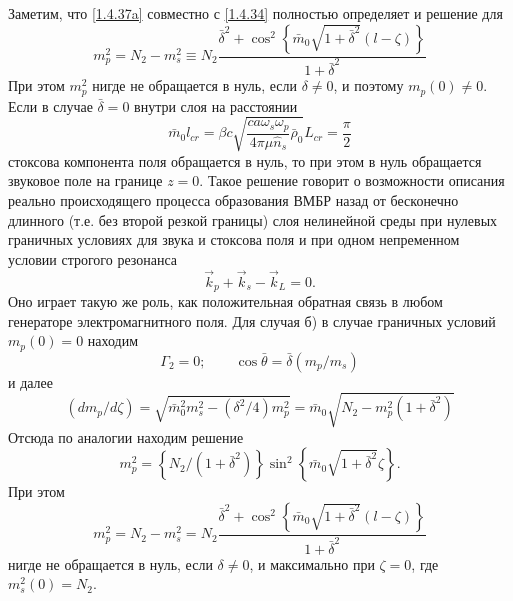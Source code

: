 \documentclass[a4paper]{article}
\begin{document}
Заметим, что \eqref{1.4.37a} совместно с \eqref{1.4.34} полностью определяет и решение для 
\begin{equation}
	m_{p}^{2}=N_{2}-m_{s}^{2}\equiv N_{2}\frac{\bar{\delta}^{2}+\cos^{2}\left\{\bar{m}_{0}\sqrt{1+\bar{\delta}^{2}}(l-\zeta)\right\}}{1+\bar{\delta}^{2}}
	\label{1.4.38a}\tag{38a}
\end{equation}
При этом $m_{p}^{2}$ нигде не обращается в нуль, если $\delta\neq0$, и поэтому $m_{p}(0)\neq0$.
\setcounter{equation}{38}
Если в случае $\bar{\delta}=0$  внутри слоя на расстоянии 
\begin{equation}
	\bar{m}_{0}l_{cr}=\beta c\sqrt{\frac{ca\omega_{s}\omega_{p}}{4\pi\mu\hat{n}_{s}}\bar{\rho}_{0}}L_{cr}=\frac{\pi}{2}
	\label{1.4.39}
\end{equation}
стоксова компонента поля обращается в нуль, то при этом в нуль обращается звуковое поле на границе $z=0$. Такое решение говорит о возможности описания реально происходящего процесса образования ВМБР назад от бесконечно длинного (т.е. без второй резкой границы) слоя нелинейной среды при нулевых граничных условиях для звука и стоксова поля и при одном непременном условии строгого резонанса
\begin{equation}
	\vec{k}_{p}+\vec{k}_{s}-\vec{k}_{L}=0.
	\label{1.4.40}
\end{equation}
Оно играет такую же роль, как положительная обратная связь в любом генераторе электромагнитного поля. 
Для случая б) в случае  граничных условий $m_{p}(0)=0$  находим 
\begin{equation}
	\Gamma_{2}=0;\qquad\cos\bar{\theta}=\bar{\delta}(m_{p}/m_{s})
	\tag{35б}\label{1.4.35б}
\end{equation}
и далее
\begin{equation}
	(dm_{p}/d\zeta)=\sqrt{\bar{m}_{0}^{2}m_{s}^{2}-(\delta^{2}/4)m_{p}^{2}}=\bar{m}_{0}\sqrt{N_{2}-m_{p}^{2}(1+\bar{\delta}^{2})}
	\tag{36б}\label{1.4.36б}
\end{equation}
Отсюда по аналогии находим решение 
\begin{equation}
	m_{p}^{2}=\left\{N_{2}/(1+\bar{\delta}^{2})\right\}\sin^{2}\left\{\bar{m}_{0}\sqrt{1+\bar{\delta}^{2}}\zeta\right\}.
	\tag{37б}\label{1.4.37б}
\end{equation}
При этом	
\begin{equation}
m_{p}^{2}=N_{2}-m_{s}^{2}=N_{2}\frac{\bar{\delta}^{2}+\cos^{2}\left\{\bar{m}_{0}\sqrt{1+\bar{\delta}^{2}}(l-\zeta)\right\}}{1+\bar{\delta}^{2}}
	\tag{38б}\label{1.4.38б}
\end{equation}
нигде не обращается в нуль, если $\delta\neq0$, и максимально при $\zeta=0$, где $m_{s}^{2}(0)=N_{2}$. 
\end{document}
